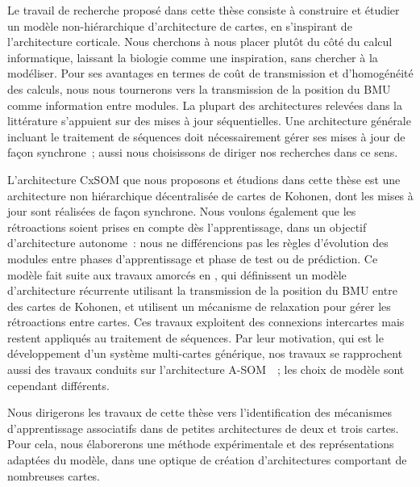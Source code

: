 \documentclass[../main]{subfiles}
\begin{document}
Le travail de recherche proposé dans cette thèse consiste à construire et étudier un modèle non-hiérarchique d'architecture de cartes, en s'inspirant de l'architecture corticale. Nous cherchons à nous placer plutôt du côté du calcul informatique, laissant la biologie comme une inspiration, sans chercher à la modéliser.
Pour ses avantages en termes de coût de transmission et d'homogénéité des calculs, nous nous tournerons vers la transmission de la position du BMU comme information entre modules.
La plupart des architectures relevées dans la littérature s'appuient sur des mises à jour séquentielles. 
Une architecture générale incluant le traitement de séquences doit nécessairement gérer ses mises à jour de façon synchrone~; aussi nous choisissons de diriger nos recherches dans ce sens.

L'architecture CxSOM que nous proposons et étudions dans cette thèse est une architecture non hiérarchique décentralisée de cartes de Kohonen, dont les mises à jour sont réalisées de façon synchrone. Nous voulons également que les rétroactions soient prises en compte dès l'apprentissage, dans un objectif d'architecture autonome~: nous ne différencions pas les règles d'évolution des modules entre phases d'apprentissage et phase de test ou de prédiction.
Ce modèle fait suite aux travaux amorcés en \cite{baheux_towards_2014}, qui définissent un modèle d'architecture récurrente utilisant la transmission de la position du BMU entre des cartes de Kohonen, et utilisent un mécanisme de relaxation pour gérer les rétroactions entre cartes. 
Ces travaux exploitent des connexions intercartes mais restent appliqués au traitement de séquences.
Par leur motivation, qui est le développement d'un système multi-cartes générique, nos travaux se rapprochent aussi des travaux conduits sur l'architecture A-SOM~\cite{johnsson_associating_2008, johnsson_associative_2009,gil_sarasom_2015, Buonamente2015DiscriminatingAS}~; les choix de modèle sont cependant différents.

Nous dirigerons les travaux de cette thèse vers l'identification des mécanismes d'apprentissage associatifs dans de petites architectures de deux et trois cartes. Pour cela, nous élaborerons une méthode expérimentale et des représentations adaptées du modèle, dans une optique de création d'architectures comportant de nombreuses cartes.


\ifSubfilesClassLoaded{
    \printbibliography
}{}
\end{document}
